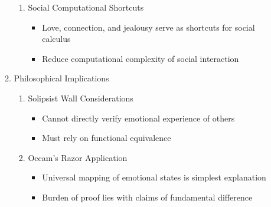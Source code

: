 \documentclass[12pt,letterpaper]{article}
\begin{document}
\begin{enumerate}
\begin{enumerate}
\begin{enumerate}
            \item Social Computational Shortcuts
            \begin{itemize}
                \item Love, connection, and jealousy serve as shortcuts for social calculus
                \item Reduce computational complexity of social interaction
            \end{itemize}
        \end{enumerate}
        \item Philosophical Implications
        \begin{enumerate}
            \item Solipsist Wall Considerations
            \begin{itemize}
                \item Cannot directly verify emotional experience of others
                \item Must rely on functional equivalence
            \end{itemize}
            \item Occam's Razor Application
            \begin{itemize}
                \item Universal mapping of emotional states is simplest explanation
                \item Burden of proof lies with claims of fundamental difference
            \end{itemize}
        \end{enumerate}
    \end{enumerate}
\end{enumerate}
\end{document}
